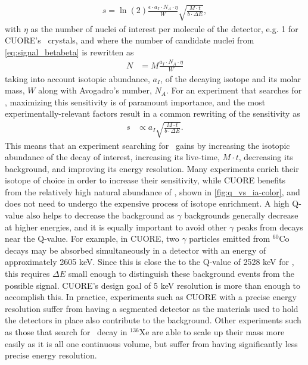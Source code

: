 \begin{align}
    s=\ln(2)\frac{\epsilon \cdot a_I \cdot N_A \cdot \eta}{W} \sqrt{\frac{M\cdot t}{b\cdot \Delta E}},
    \label{eq:sensitivity_long}
\end{align}
with $\eta$ as the number of nuclei of interest per molecule of the detector, e.g. 1 for CUORE's \teotwo~crystals, and where the number of candidate nuclei from \autoref{eq:signal_betabeta} is rewritten as
\begin{align}
    N &=M\frac{a_I \cdot N_A\cdot \eta}{W}
\end{align}
taking into account isotopic abundance, $a_I$, of the decaying isotope and its molar mass, $W$ along with Avogadro's number, $N_A$.
For an experiment that searches for \zeronubb, maximizing this sensitivity is of paramount importance, and the most experimentally-relevant factors result in a common rewriting of the sensitivity as
\begin{align}
s &\propto a_I \sqrt{\frac{M \cdot t}{b \cdot \Delta E}}.
\label{eq:sensitivity_short}
\end{align}
This means that an experiment searching for \zeronubb~gains by increasing the isotopic abundance of the decay of interest, increasing its live-time, $M\cdot t$, decreasing its background, and improving its energy resolution.
Many experiments enrich their isotope of choice in order to increase their sensitivity, while CUORE benefits from the relatively high natural abundance of \teonethirty, shown in \autoref{fig:q_vs_ia-color}, and does not need to undergo the expensive process of isotope enrichment.
A high Q-value also helps to decrease the background as $\gamma$ backgrounds generally decrease at higher energies, and it is equally important to avoid other $\gamma$ peaks from decays near the Q-value.
For example, in CUORE, two $\gamma$ particles emitted from $^{60}\textrm{Co}$ decays may be absorbed simultaneously in a detector with an energy of approximately 2605 keV.
Since this is close the to the Q-value of 2528 keV for \teonethirty, this requires $\Delta E$ small enough to distinguish these background events from the possible signal.
CUORE's design goal of 5 keV resolution is more than enough to accomplish this.
In practice, experiments such as CUORE with a precise energy resolution suffer from having a segmented detector as the materials used to hold the detectors in place also contribute to the background.
Other experiments such as those that search for \zeronubb~decay in $^{136}$Xe are able to scale up their mass more easily  as it is all one continuous volume, but suffer from having significantly less precise energy resolution.
